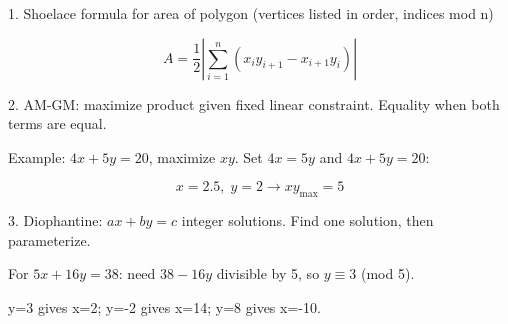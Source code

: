 1. Shoelace formula for area of polygon (vertices listed in order, indices mod n)

$$ A = \frac{1}{2} \left| \sum_{i=1}^{n} (x_i y_{i+1} - x_{i+1} y_i) \right| $$

2. AM-GM: maximize product given fixed linear constraint. Equality when both terms are equal.

Example: $4x + 5y = 20$, maximize $xy$. Set $4x = 5y$ and $4x+5y=20$:

$$ x=2.5, \; y=2 \rightarrow xy_{\max}=5 $$

3. Diophantine: $ax + by = c$ integer solutions. Find one solution, then parameterize.

For $5x + 16y = 38$: need $38 - 16y$ divisible by 5, so $y \equiv 3$ (mod 5).

y=3 gives x=2; y=-2 gives x=14; y=8 gives x=-10.
